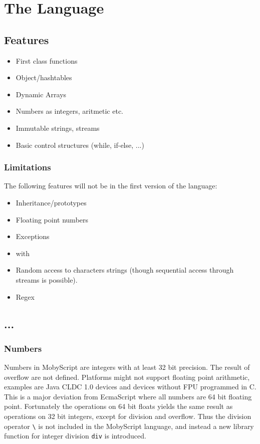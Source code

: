 \chapter{The Language}

\section{Features}

\begin{itemize}
\item First class functions
\item Object/hashtables
\item Dynamic Arrays
\item Numbers as integers, aritmetic etc.
\item Immutable strings, streams
\item Basic control structures (while, if-else, ...)
\end{itemize}

\subsection{Limitations}
The following features will not be in the first version of the language:
\begin{itemize}
\item Inheritance/prototypes
\item Floating point numbers
\item Exceptions
\item with
\item Random access to characters strings (though sequential access through streams is possible).
\item Regex
\end{itemize}

\section{...}
\subsection{Numbers}
Numbers in MobyScript are integers with at least 32 bit precision.
The result of overflow are not defined.
Platforms might not support floating point arithmetic, examples are Java CLDC 1.0 devices and devices without FPU programmed in C.
This is a major deviation from EcmaScript where all numbers are 64 bit floating point. 
Fortunately the operations on 64 bit floats yields the same result as operations on 32 bit integers, except for division and overflow. 
Thus the division operator \verb|\| is not included in the MobyScript language, and
instead a new library function for integer division \verb|div| is introduced.

